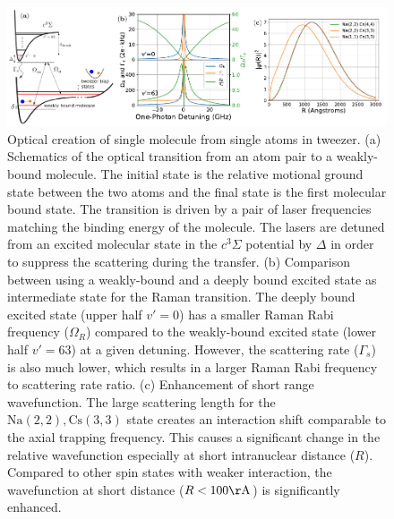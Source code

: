\documentclass[aps,prl,twocolumn,superscriptaddress]{revtex4-1}
\newcommand{\Na}{\mathrm{Na}}
\newcommand{\Cs}{\mathrm{Cs}}
\begin{document}
\begin{figure}
  \includegraphics[width=\textwidth]{fig1.pdf}
  \caption{Optical creation of single molecule from single atoms in tweezer.
    (a) Schematics of the optical transition from an atom pair to a weakly-bound molecule.
    The initial state is the relative motional ground state between the two atoms
    and the final state is the first molecular bound state.
    The transition is driven by a pair of laser frequencies matching the binding energy
    of the molecule.
    The lasers are detuned from an excited molecular state in the $c^3\Sigma$ potential
    by $\Delta$ in order to suppress the scattering during the transfer.
    (b) Comparison between using a weakly-bound and a deeply bound excited state
    as intermediate state for the Raman transition.
    The deeply bound excited state (upper half $v'=0$)
    has a smaller Raman Rabi frequency ($\Omega_{R}$)
    compared to the weakly-bound excited state (lower half $v'=63$) at a given detuning.
    However, the scattering rate ($\Gamma_{s}$) is also much lower,
    which results in a larger Raman Rabi frequency to scattering rate ratio.
    (c) Enhancement of short range wavefunction.
    The large scattering length for the $\Na(2,2),\Cs(3,3)$ state creates an interaction shift
    comparable to the axial trapping frequency.
    This causes a significant change in the relative wavefunction especially at short
    intranuclear distance ($R$).
    Compared to other spin states with weaker interaction,
    the wavefunction at short distance ($R<100\mathrm{\AA}$) is significantly enhanced.
    \label{f-theory}
  }
\end{figure}





\end{document}
